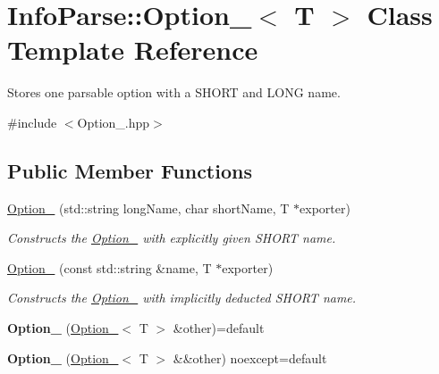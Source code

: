 \hypertarget{class_info_parse_1_1_option__}{}\section{Info\+Parse\+::Option\+\_\+$<$ T $>$ Class Template Reference}
\label{class_info_parse_1_1_option__}


Stores one parsable option with a S\+H\+O\+RT and L\+O\+NG name.




{\ttfamily \#include $<$Option\+\_\+.\+hpp$>$}

\subsection*{Public Member Functions}
\begin{DoxyCompactItemize}
    \item
    \mbox{\hyperlink{class_info_parse_1_1_option___a2f82c5bf879e405f1601b05c1fbf3f42}{Option\+\_\+}} (std\+::string long\+Name, char short\+Name, T $\ast$exporter)
    \begin{DoxyCompactList}
        \small\item\em Constructs the \mbox{\hyperlink{class_info_parse_1_1_option__}{Option\+\_\+}} with explicitly given S\+H\+O\+RT name.
    \end{DoxyCompactList}\item
    \mbox{\hyperlink{class_info_parse_1_1_option___a0db458c278bfa358675d3afaf5f004bc}{Option\+\_\+}} (const std\+::string \&name, T $\ast$exporter)
    \begin{DoxyCompactList}
        \small\item\em Constructs the \mbox{\hyperlink{class_info_parse_1_1_option__}{Option\+\_\+}} with implicitly deducted S\+H\+O\+RT name.
    \end{DoxyCompactList}\item
    \mbox{\label{class_info_parse_1_1_option___a9b0d0782e770128b581c562229aa8124}}
    {\bfseries Option\+\_\+} (\mbox{\hyperlink{class_info_parse_1_1_option__}{Option\+\_\+}}$<$ T $>$ \&other)=default
    \item
    \mbox{\label{class_info_parse_1_1_option___a0ab9aad9077d0922a04c7fce75cda4e0}}
    {\bfseries Option\+\_\+} (\mbox{\hyperlink{class_info_parse_1_1_option__}{Option\+\_\+}}$<$ T $>$ \&\&other) noexcept=default

\end{DoxyCompactItemize}
